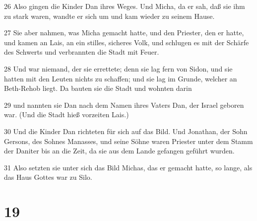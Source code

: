 \par 26 Also gingen die Kinder Dan ihres Weges. Und Micha, da er sah, daß sie ihm zu stark waren, wandte er sich um und kam wieder zu seinem Hause.
\par 27 Sie aber nahmen, was Micha gemacht hatte, und den Priester, den er hatte, und kamen an Lais, an ein stilles, sicheres Volk, und schlugen es mit der Schärfe des Schwerts und verbrannten die Stadt mit Feuer.
\par 28 Und war niemand, der sie errettete; denn sie lag fern von Sidon, und sie hatten mit den Leuten nichts zu schaffen; und sie lag im Grunde, welcher an Beth-Rehob liegt. Da bauten sie die Stadt und wohnten darin
\par 29 und nannten sie Dan nach dem Namen ihres Vaters Dan, der Israel geboren war. (Und die Stadt hieß vorzeiten Lais.)
\par 30 Und die Kinder Dan richteten für sich auf das Bild. Und Jonathan, der Sohn Gersons, des Sohnes Manasses, und seine Söhne waren Priester unter dem Stamm der Daniter bis an die Zeit, da sie aus dem Lande gefangen geführt wurden.
\par 31 Also setzten sie unter sich das Bild Michas, das er gemacht hatte, so lange, als das Haus Gottes war zu Silo.

\chapter{19}

